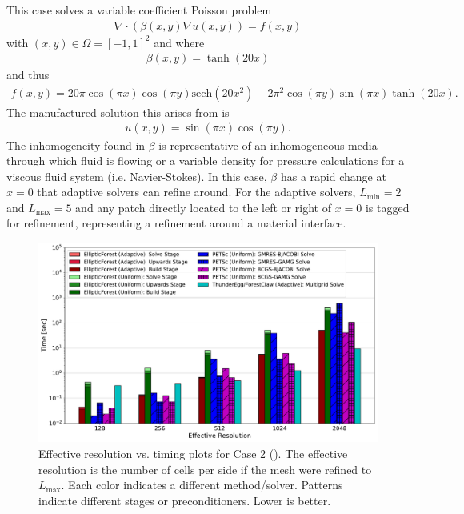 This case solves a variable coefficient Poisson problem
\begin{align}
    \nabla \cdot \left( \beta(x,y) \nabla u(x,y) \right) = f(x,y)
\end{align}
with $(x,y) \in \Omega = [-1,1]^2$ and where
\begin{align}
    \beta(x,y) = \tanh(20 x)
\end{align}
and thus
\begin{align}
    f(x,y) = 20 \pi \cos(\pi x) \cos(\pi y) \text{sech}(20 x^2) - 2 \pi^2 \cos(\pi y) \sin(\pi x) \tanh(20 x).
\end{align}
The manufactured solution this arises from is
\begin{align}
    u(x,y) = \sin(\pi x) \cos(\pi y).
\end{align}
The inhomogeneity found in $\beta$ is representative of an inhomogeneous media through which fluid is flowing or a variable density for pressure calculations for a viscous fluid system (i.e. Navier-Stokes). In this case, $\beta$ has a rapid change at $x = 0$ that adaptive solvers can refine around. For the adaptive solvers, $L_{\text{min}} = 2$ and $L_{\text{max}} = 5$ and any patch directly located to the left or right of $x = 0$ is tagged for refinement, representing a refinement around a material interface.

    \begin{figure}
        \centering
        \includegraphics[width=1.0\textwidth, clip=true, trim={0 0 0 0}]{figures/case02-stacked-bar-plot-comparisons-no-title.pdf}
        \caption{Effective resolution vs. timing plots for Case 2 (). The effective resolution is the number of cells per side if the mesh were refined to $L_{\text{max}}$. Each color indicates a different method/solver. Patterns indicate different stages or preconditioners. Lower is better.}
        \label{fig:case02-stacked-bar-plot}
    \end{figure}

